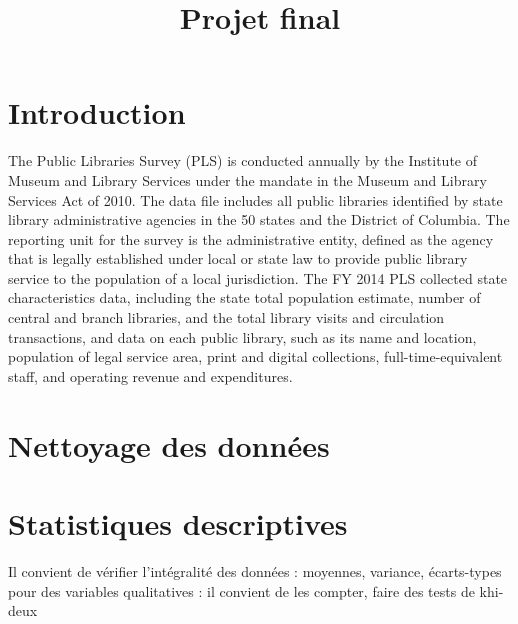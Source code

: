 \documentclass[14pt,]{article}
\title{Projet final}
\author{}
\date{}
\begin{document}
\maketitle

\hypertarget{introduction}{%
\section{Introduction}\label{introduction}}

\fontsize{12}{22}
\selectfont
\nobreakspace

The Public Libraries Survey (PLS) is conducted annually by the Institute
of Museum and Library Services under the mandate in the Museum and
Library Services Act of 2010. The data file includes all public
libraries identified by state library administrative agencies in the 50
states and the District of Columbia. The reporting unit for the survey
is the administrative entity, defined as the agency that is legally
established under local or state law to provide public library service
to the population of a local jurisdiction. The FY 2014 PLS collected
state characteristics data, including the state total population
estimate, number of central and branch libraries, and the total library
visits and circulation transactions, and data on each public library,
such as its name and location, population of legal service area, print
and digital collections, full-time-equivalent staff, and operating
revenue and expenditures.

\pagebreak

\hypertarget{nettoyage-des-donnuxe9es}{%
\section{Nettoyage des données}\label{nettoyage-des-donnuxe9es}}

\pagebreak

\hypertarget{statistiques-descriptives}{%
\section{Statistiques descriptives}\label{statistiques-descriptives}}

Il convient de vérifier l'intégralité des données : moyennes, variance,
écarts-types pour des variables qualitatives : il convient de les
compter, faire des tests de khi-deux
\end{document}
